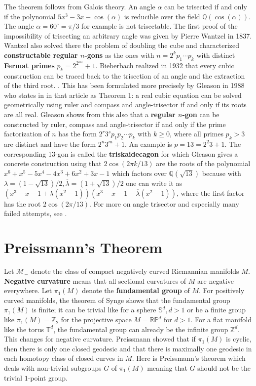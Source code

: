 \documentclass[12pt]{amsart}
\newcounter{example}    \def\example#1{ \item \fontsize{12}{15} \selectfont #1 \fontsize{12}{15} \selectfont }
\begin{document}
The theorem follows from Galois theory. An angle $\alpha$ can be trisected if and only
if the polynomial $5x^3-3x-\cos(\alpha)$ is reducible over the field $\mathbb{Q}(\cos(\alpha))$.
The angle $\alpha=60^{\circ}= \pi/3$ for example is not trisectable.
The first proof of the impossibility of trisecting an arbitrary angle was given by
Pierre Wantzel in 1837. Wantzel also solved there the problem of doubling the cube
and characterized {\bf constructable regular $n$-gons} as the ones with
$n=2^k p_1 \cdots p_k$ with distinct {\bf Fermat primes} $p_k = 2^{2^{m_k}}+1$.
Bieberbach realized in 1932 that every cubic construction can be traced back to the
trisection of an angle and the extraction of the third root. \cite{Biberbach1932}.
This has been formulated more precisely by Gleason in 1988 \cite{Gleason1988}
who states in in that article as Theorem 1:
a real cubic equation can be solved geometrically using ruler
and compass and angle-trisector if and only if its roots are all real.
Gleason shows from this also that a {\bf regular $n$-gon} can be constructed
by ruler, compass and angle-trisector if and only if the prime factorization
of $n$ has the form $2^r 3^s p_1 p_2 \cdots p_k$ with $k \geq 0$,
where all primes $p_k>3$ are distinct and have the form $2^n 3^m + 1$.
An example is $p=13=2^2  3 + 1$. The corresponding 13-gon is called the
{\bf triskaidecagon} for which Gleason gives a concrete construction using
that $2 \cos(2\pi k/13)$ are the roots of the polynomial
$x^6+x^5-5x^4-4x^3+6x^2+3x-1$ which factors over $\mathbb{Q}(\sqrt{13})$
because with $\lambda = (1-\sqrt{13})/2, \overline{\lambda} = (1+\sqrt{13})/2$
one can write it as $(x^3-x-1+\lambda (x^2-1)) (x^3-x-1-\overline{\lambda}(x^2-1))$,
where the first factor has the root $2 \cos(2\pi/13)$.
For more on angle trisector and especially many failed attempts, see \cite{Trisectors}.

\section{Preissmann's Theorem}

Let $\mathcal{M}_{-}$ denote the class of compact negatively curved Riemannian manifolds $M$.
{\bf Negative curvature} means that all sectional curvatures of $M$ are negative
everywhere. Let $\pi_1(M)$ denote the {\bf fundamental group} of $M$. 
For positively curved manifolds, the theorem of Synge shows that the fundamental
group $\pi_1(M)$ is finite; it can be trivial like for a sphere $\mathbb{S}^d, d >1$ or
be a finite group like $\pi_1(M)=\mathbb{Z}_2$ for the projective space $M=\mathbb{RP}^d$ 
for $d>1$. For a flat manifold like the torus $\mathbb{T}^d$, the fundamental group can 
already be the infinite group $\mathbb{Z}^d$. This changes for negative curvature. Preissmann
showed that if $\pi_1(M)$ is cyclic, then there is only one closed geodesic and
that there is maximally one geodesic in each homotopy class of closed curves in $M$. Here
is Preissmann's theorem which deals with non-trivial subgroups $G$ of $\pi_1(M)$ meaning
that $G$ should not be the trivial $1$-point group.
\end{document}

